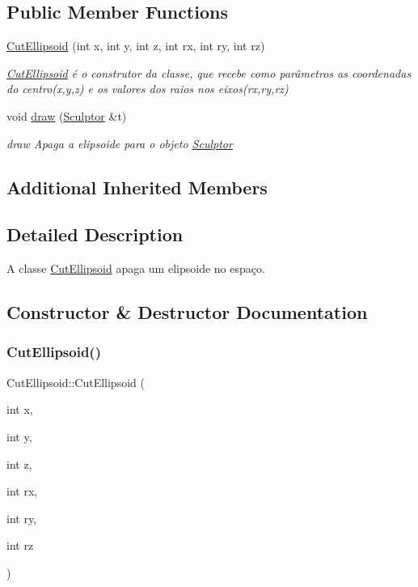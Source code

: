 \subsection*{Public Member Functions}
\begin{DoxyCompactItemize}
\item 
\hyperlink{class_cut_ellipsoid_ad34403f4c6042545d35854f7d2e5db1b}{Cut\+Ellipsoid} (int x, int y, int z, int rx, int ry, int rz)
\begin{DoxyCompactList}\small\item\em \hyperlink{class_cut_ellipsoid}{Cut\+Ellipsoid} é o construtor da classe, que recebe como parâmetros as coordenadas do centro(x,y,z) e os valores dos raios nos eixos(rx,ry,rz) \end{DoxyCompactList}\item 
void \hyperlink{class_cut_ellipsoid_a7110c3cd9dc76bd09ec259b429a3e532}{draw} (\hyperlink{class_sculptor}{Sculptor} \&t)
\begin{DoxyCompactList}\small\item\em draw Apaga a elipsoide para o objeto \hyperlink{class_sculptor}{Sculptor} \end{DoxyCompactList}\end{DoxyCompactItemize}
\subsection*{Additional Inherited Members}


\subsection{Detailed Description}
A classe \hyperlink{class_cut_ellipsoid}{Cut\+Ellipsoid} apaga um elipsoide no espaço. 

\subsection{Constructor \& Destructor Documentation}
\mbox{\label{class_cut_ellipsoid_ad34403f4c6042545d35854f7d2e5db1b}} 
\subsubsection{\texorpdfstring{Cut\+Ellipsoid()}{CutEllipsoid()}}
{\footnotesize\ttfamily Cut\+Ellipsoid\+::\+Cut\+Ellipsoid (\begin{DoxyParamCaption}\item[{int}]{x,  }\item[{int}]{y,  }\item[{int}]{z,  }\item[{int}]{rx,  }\item[{int}]{ry,  }\item[{int}]{rz }\end{DoxyParamCaption})}



